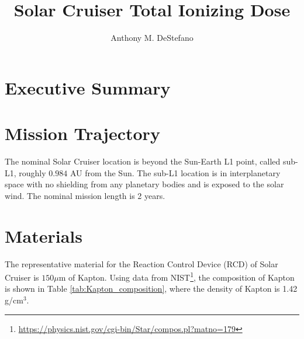 \documentclass{hitec}
\title{Solar Cruiser Total Ionizing Dose}
\author{Anthony M. DeStefano}
\begin{document}
\maketitle
{}

\tableofcontents
\listoffigures
\listoftables
\newpage






\cleardoublepage
{}
\section{Executive Summary}





\newpage
\section{Mission Trajectory}

The nominal Solar Cruiser location is beyond the Sun-Earth L1 point, called sub-L1, roughly $0.984$ AU from the Sun. The sub-L1 location is in interplanetary space with no shielding from any planetary bodies and is exposed to the solar wind. The nominal mission length is 2 years.

\section{Materials}

The representative material for the Reaction Control Device (RCD) of Solar Cruiser is $150 \mu\text{m}$ of Kapton. Using data from NIST\footnote{\url{https://physics.nist.gov/cgi-bin/Star/compos.pl?matno=179}}, the composition of Kapton is shown in Table \ref{tab:Kapton_composition}, where the density of Kapton is 1.42 g/cm$^3$.
\end{document}
